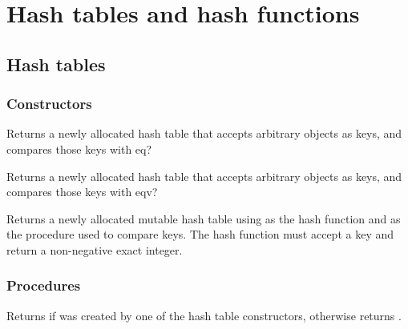 \documentclass[twoside]{algol60}
\begin{document}
\chapter{Hash tables and hash functions}


\section{Hash tables}

\subsection{Constructors}


\begin{entry}{%
}

Returns a newly allocated hash table that accepts arbitrary objects 
as keys, and compares those keys with eq?  

\end{entry}

\begin{entry}{%
}

Returns a newly allocated hash table that accepts arbitrary objects 
as keys, and compares those keys with eqv?

\end{entry}

\begin{entry}{%
}

Returns a newly allocated mutable hash table using  
as the hash function and  as the procedure used to 
compare keys.  The hash function must accept a key and return a 
non-negative exact integer.

\end{entry}

\subsection{Procedures}

\begin{entry}{}
    Returns \schtrue{} if  was created by one of the hash table constructors, otherwise returns \schfalse.
\end{entry}
\end{document}
